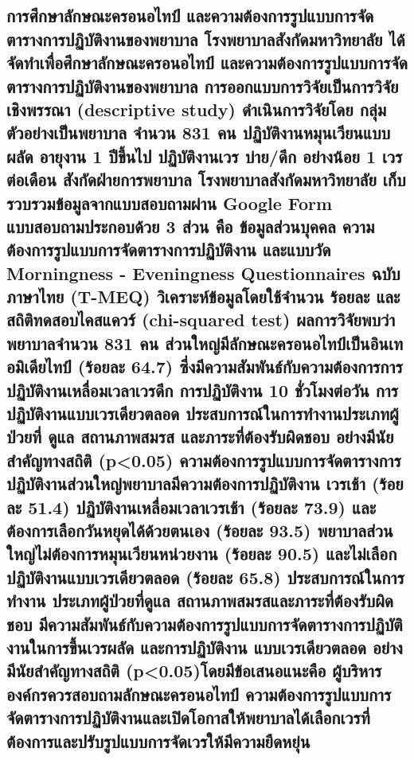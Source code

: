 \hspace{0cm}\subsection{การศึกษาลักษณะครอนอไทป์ และความต้องการรูปแบบการจัดตารางการปฏิบัติงานของพยาบาล โรงพยาบาลสังกัดมหาวิทยาลัย ได้จัดทำเพื่อศึกษาลักษณะครอนอไทป์ และความต้องการรูปแบบการจัด ตารางการปฏิบัติงานของพยาบาล การออกแบบการวิจัยเป็นการวิจัยเชิงพรรณา (descriptive study) ดำเนินการวิจัยโดย กลุ่มตัวอย่างเป็นพยาบาล จำนวน 831 คน ปฏิบัติงานหมุนเวียนแบบผลัด อายุงาน 1 ปีขึ้นไป ปฏิบัติงานเวร บ่าย/ดึก  อย่างน้อย 1 เวรต่อเดือน  สังกัดฝ่ายการพยาบาล โรงพยาบาลสังกัดมหาวิทยาลัย  เก็บรวบรวมข้อมูลจากแบบสอบถามผ่าน Google Form  แบบสอบถามประกอบด้วย 3 ส่วน คือ ข้อมูลส่วนบุคคล  ความต้องการรูปแบบการจัดตารางการปฏิบัติงาน และแบบวัด Morningness - Eveningness Questionnaires ฉบับภาษาไทย (T-MEQ)  วิเคราะห์ข้อมูลโดยใช้จำนวน ร้อยละ และ สถิติทดสอบไคสแควร์ (chi-squared test) ผลการวิจัยพบว่าพยาบาลจำนวน 831 คน  ส่วนใหญ่มีลักษณะครอนอไทป์เป็นอินเทอมิเดียไทป์ (ร้อยละ 64.7) ซึ่งมีความสัมพันธ์กับความต้องการการปฏิบัติงานเหลื่อมเวลาเวรดึก  การปฏิบัติงาน 10 ชั่วโมงต่อวัน การปฏิบัติงานแบบเวรเดียวตลอด   ประสบการณ์ในการทำงานประเภทผู้ป่วยที่ ดูแล  สถานภาพสมรส และภาระที่ต้องรับผิดชอบ อย่างมีนัยสำคัญทางสถิติ (p<0.05) ความต้องการรูปแบบการจัดตารางการปฏิบัติงานส่วนใหญ่พยาบาลมีความต้องการปฏิบัติงาน เวรเช้า (ร้อยละ 51.4)  ปฏิบัติงานเหลื่อมเวลาเวรเช้า (ร้อยละ 73.9) และต้องการเลือกวันหยุดได้ด้วยตนเอง (ร้อยละ 93.5)  พยาบาลส่วนใหญ่ไม่ต้องการหมุนเวียนหน่วยงาน (ร้อยละ 90.5) และไม่เลือกปฏิบัติงานแบบเวรเดียวตลอด (ร้อยละ 65.8) ประสบการณ์ในการทำงาน ประเภทผู้ป่วยที่ดูแล สถานภาพสมรสและภาระที่ต้องรับผิดชอบ มีความสัมพันธ์กับความต้องการรูปแบบการจัดตารางการปฏิบัติงานในการขึ้นเวรผลัด และการปฏิบัติงาน แบบเวรเดียวตลอด  อย่างมีนัยสำคัญทางสถิติ (p<0.05)โดยมีข้อเสนอแนะคือ ผู้บริหารองค์กรควรสอบถามลักษณะครอนอไทป์ ความต้องการรูปแบบการจัดตารางการปฏิบัติงานและเปิดโอกาสให้พยาบาลได้เลือกเวรที่ต้องการและปรับรูปแบบการจัดเวรให้มีความยืดหยุ่น \cite{vijai3}}

